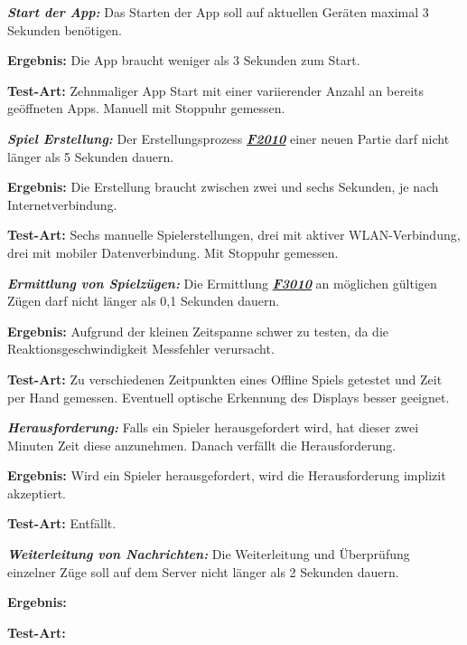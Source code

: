 \documentclass[parskip=full]{scrartcl}
\begin{document}
\begin{description}
	
	\item[NF1010] \textbf{\textit{Start der App: }} Das Starten der App soll auf aktuellen Geräten maximal 3 Sekunden benötigen. 
	\item \textbf{Ergebnis: } Die App braucht weniger als 3 Sekunden zum Start.
	\item \textbf{Test-Art: } Zehnmaliger App Start mit einer variierender Anzahl an bereits geöffneten Apps. Manuell mit Stoppuhr gemessen.
	
	\item[NF1020] \textbf{\textit{Spiel Erstellung: }} Der Erstellungsprozess \hyperlink{F2010}{\textbf{\textit{F2010}}} einer neuen Partie darf nicht länger als 5 Sekunden dauern.
	\item \textbf{Ergebnis: } Die Erstellung braucht zwischen zwei und sechs Sekunden, je nach Internetverbindung.
	\item \textbf{Test-Art: } Sechs manuelle Spielerstellungen, drei mit aktiver WLAN-Verbindung, drei mit mobiler Datenverbindung. Mit Stoppuhr gemessen.
	
	\item[NF1030] \textbf{\textit{Ermittlung von Spielzügen: }} Die Ermittlung \hyperlink{F3010}{\textbf{\textit{F3010}}} an möglichen gültigen Zügen darf nicht länger als 0,1 Sekunden dauern.
	\item \textbf{Ergebnis: } Aufgrund der kleinen Zeitspanne schwer zu testen, da die Reaktionsgeschwindigkeit Messfehler verursacht.
	\item \textbf{Test-Art: } Zu verschiedenen Zeitpunkten eines Offline Spiels getestet und Zeit per Hand gemessen. Eventuell optische Erkennung des Displays besser geeignet.
	
	\item[NF1040] \textbf{\textit{Herausforderung: }} Falls ein Spieler herausgefordert wird, hat dieser zwei Minuten Zeit diese anzunehmen. Danach verfällt die Herausforderung. 
	\item \textbf{Ergebnis: } Wird ein Spieler herausgefordert, wird die Herausforderung implizit akzeptiert.
	\item \textbf{Test-Art: } Entfällt.
	
	\item[NF1050] \textbf{\textit{Weiterleitung von Nachrichten: }} Die Weiterleitung und Überprüfung einzelner Züge soll auf dem Server nicht länger als 2 Sekunden dauern.
	\item \textbf{Ergebnis: }
	\item \textbf{Test-Art: }
	

\end{description}
\end{document}
